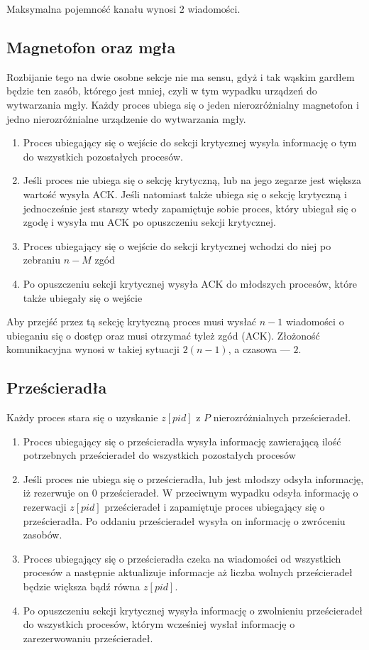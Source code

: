 \documentclass{article}
\begin{document}
Maksymalna pojemność kanału wynosi $2$ wiadomości.


\subsection{Magnetofon oraz mgła}
Rozbijanie tego na dwie osobne sekcje nie ma sensu, gdyż i tak wąskim gardłem będzie ten zasób, którego jest mniej, czyli w tym wypadku urządzeń do wytwarzania mgły. Każdy proces ubiega się o jeden nierozróżnialny magnetofon i jedno nierozróżnialne urządzenie do wytwarzania mgły.
\begin{enumerate}
    \item Proces ubiegający się o wejście do sekcji krytycznej wysyła informację o tym do wszystkich pozostałych procesów. 
    \item Jeśli proces nie ubiega się o sekcję krytyczną, lub na jego zegarze jest większa wartość wysyła ACK. Jeśli natomiast także ubiega się o sekcję krytyczną i jednocześnie jest starszy wtedy zapamiętuje sobie proces, który ubiegał się o zgodę i wysyła mu ACK po opuszczeniu sekcji krytycznej.
    \item Proces ubiegający się o wejście do sekcji krytycznej wchodzi do niej po zebraniu $n - M$ zgód
    \item Po opuszczeniu sekcji krytycznej wysyła ACK do młodszych procesów, które także ubiegały się o wejście
\end{enumerate}

Aby przejść przez tą sekcję krytyczną proces musi wysłać $n-1$ wiadomości o ubieganiu się o dostęp oraz musi otrzymać tyleż zgód (ACK).
Złożoność komunikacyjna wynosi w takiej sytuacji $2(n-1)$, a czasowa --- $2$.

\subsection{Prześcieradła}
Każdy proces stara się o uzyskanie $z[pid]$ z $P$ nierozróżnialnych prześcieradeł.
\begin{enumerate}
    \item Proces ubiegający się o prześcieradła wysyła informację zawierającą ilość potrzebnych prześcieradeł do wszystkich pozostałych procesów
    \item Jeśli proces nie ubiega się o prześcieradła, lub jest młodszy odsyła informację, iż rezerwuje on $0$ prześcieradeł. W przeciwnym wypadku odsyła informację o rezerwacji $z[pid]$ prześcieradeł i zapamiętuje proces ubiegający się o prześcieradła. Po oddaniu prześcieradeł wysyła on informację o zwróceniu zasobów.
    \item Proces ubiegający się o prześcieradła czeka na wiadomości od wszystkich procesów a następnie aktualizuje informacje aż liczba wolnych prześcieradeł będzie większa bądź równa $z[pid]$.
    \item Po opuszczeniu sekcji krytycznej wysyła informację o zwolnieniu prześcieradeł do wszystkich procesów, którym wcześniej wysłał informację o zarezerwowaniu prześcieradeł.
\end{enumerate}
\end{document}
